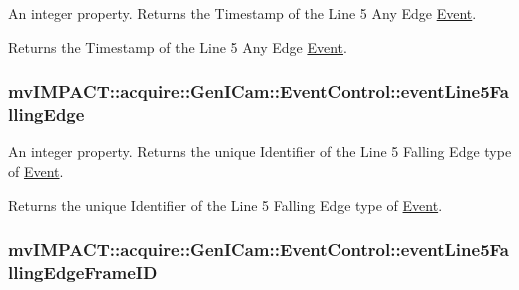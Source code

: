 An integer property. Returns the Timestamp of the Line 5 Any Edge \hyperlink{classmv_i_m_p_a_c_t_1_1acquire_1_1_event}{Event}. 

Returns the Timestamp of the Line 5 Any Edge \hyperlink{classmv_i_m_p_a_c_t_1_1acquire_1_1_event}{Event}. \hypertarget{classmv_i_m_p_a_c_t_1_1acquire_1_1_gen_i_cam_1_1_event_control_adb9c1e0d3edf268a718ebffe35b87fd5}{
\subsubsection[{event\+Line5\+Falling\+Edge}]{ mv\+I\+M\+P\+A\+C\+T\+::acquire\+::\+Gen\+I\+Cam\+::\+Event\+Control\+::event\+Line5\+Falling\+Edge}}\label{classmv_i_m_p_a_c_t_1_1acquire_1_1_gen_i_cam_1_1_event_control_adb9c1e0d3edf268a718ebffe35b87fd5}


An integer property. Returns the unique Identifier of the Line 5 Falling Edge type of \hyperlink{classmv_i_m_p_a_c_t_1_1acquire_1_1_event}{Event}. 

Returns the unique Identifier of the Line 5 Falling Edge type of \hyperlink{classmv_i_m_p_a_c_t_1_1acquire_1_1_event}{Event}. \hypertarget{classmv_i_m_p_a_c_t_1_1acquire_1_1_gen_i_cam_1_1_event_control_ae6b9ade841d87a46d7c9258a2e4258b3}{
\subsubsection[{event\+Line5\+Falling\+Edge\+Frame\+I\+D}]{ mv\+I\+M\+P\+A\+C\+T\+::acquire\+::\+Gen\+I\+Cam\+::\+Event\+Control\+::event\+Line5\+Falling\+Edge\+Frame\+I\+D}}\label{classmv_i_m_p_a_c_t_1_1acquire_1_1_gen_i_cam_1_1_event_control_ae6b9ade841d87a46d7c9258a2e4258b3}


